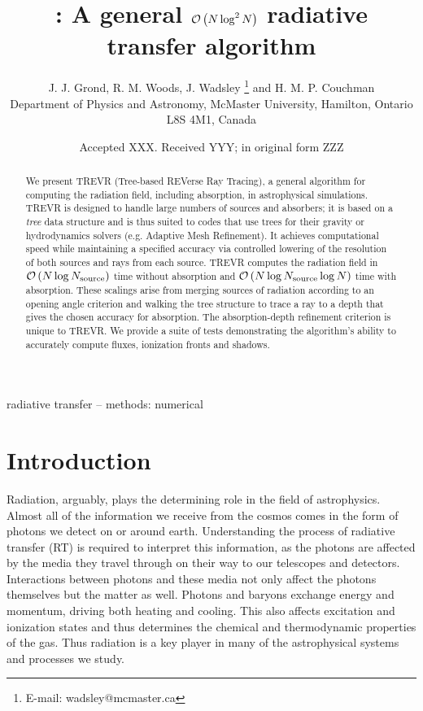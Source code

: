 \documentclass[fleq,usenatbib]{mnras}
\title[]{\acro{}: A general $\bigO{N\log^2N}$ radiative transfer algorithm}
\author[J. J. Grond et al.]{
J. J. Grond,
R. M. Woods,
J. Wadsley \thanks{E-mail:  wadsley@mcmaster.ca}
and H. M. P. Couchman
\\
Department of Physics and Astronomy, McMaster University, Hamilton, Ontario L8S
 4M1, Canada}
\date{Accepted XXX. Received YYY; in original form ZZZ}
\newcommand{\acro}{TREVR}
\newcommand{\bigO}[1]{\mathcal{O}\left(#1\right)}
\newcommand{\NS}{N_{\rm source}}
\begin{document}
\label{firstpage}
\pagerange{\pageref{firstpage}--\pageref{lastpage}}
\maketitle

\begin{abstract}
We present \acro{} (Tree-based REVerse Ray Tracing), a general algorithm for 
computing the radiation field, including absorption, in astrophysical 
simulations. \acro{} is designed to handle large numbers of sources and 
absorbers; it is based on a \emph{tree} data structure and is thus suited to 
codes that use trees for their gravity or hydrodynamics solvers (e.g. Adaptive 
Mesh Refinement). It achieves computational speed while maintaining a 
specified accuracy via controlled lowering of the resolution of both sources 
and rays from each source. \acro{} computes the radiation field in 
$\bigO{N\log\NS}$ time without absorption and $\bigO{N \log \NS \log{N}}$ time 
with absorption. These scalings arise from merging sources of radiation 
according to an opening angle criterion and walking the tree structure to 
trace a ray to a depth that gives the chosen accuracy for absorption. The 
absorption-depth refinement criterion is unique to \acro{}. We provide a suite 
of tests demonstrating the algorithm's ability to accurately compute fluxes, 
ionization fronts and shadows.   

\end{abstract}

\begin{keywords}
radiative transfer -- methods: numerical
\end{keywords}



\section{Introduction}\label{sec:intr}
Radiation, arguably, plays the determining role in the field of astrophysics. 
Almost all of the information we receive from the cosmos comes in the form of 
photons we detect on or around earth. Understanding the process of radiative 
transfer (RT) is required to interpret this information, as the photons are 
affected by the media they travel through on their way to our telescopes and 
detectors. Interactions between photons and these media not only affect the 
photons themselves but the matter as well. Photons and baryons exchange energy 
and momentum, driving both heating and cooling. This also affects excitation 
and ionization states and thus determines the chemical and thermodynamic 
properties of the gas. Thus radiation is a key player in many of the 
astrophysical systems and processes we study.
\end{document}

